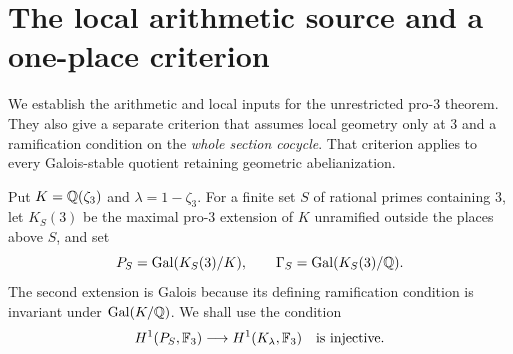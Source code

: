 \section{The local arithmetic source and a one-place criterion}
\label{sec:local-arithmetic-source}

We establish the arithmetic and local inputs for the unrestricted
pro-$3$ theorem. They also give a separate criterion that assumes
local geometry only at $3$ and a ramification condition on the
\emph{whole section cocycle}. That criterion applies to every
Galois-stable quotient retaining geometric abelianization.

Put $K=\mathbb Q(\zeta_3)$ and $\lambda=1-\zeta_3$. For a finite set $S$ of
rational primes containing $3$, let $K_S(3)$ be the maximal pro-$3$
extension of $K$ unramified outside the places above $S$, and set
\[
 P_S=\operatorname{Gal}(K_S(3)/K),\qquad
 \Gamma_S=\operatorname{Gal}(K_S(3)/\mathbb Q).
\]
The second extension is Galois because its defining ramification
condition is invariant under $\operatorname{Gal}(K/\mathbb Q)$. We shall use the condition
\begin{equation}
 H^1(P_S,\mathbb F_3)\longrightarrow H^1(K_\lambda,\mathbb F_3)
 \quad\hbox{is injective}.
 \label{eq:sourcecriterion}
\end{equation}

